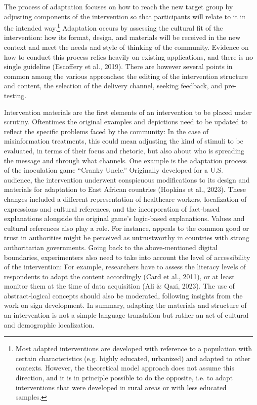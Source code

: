 \documentclass[authordate, reflection]{jote-new-article}
\begin{document}
	The process of adaptation focuses on how to reach the new target group by adjusting components of the intervention so that participants will relate to it in the intended way.\footnote{ Most adapted interventions are developed with reference to a population with certain characteristics (e.g. highly educated, urbanized) and adapted to other contexts. However, the theoretical model approach does not assume this direction, and it is in principle possible to do the opposite, i.e. to adapt interventions that were developed in rural areas or with less educated samples.} Adaptation occurs by assessing the cultural fit of the intervention: how its format, design, and materials will be received in the new context and meet the needs and style of thinking of the community. Evidence on how to conduct this process relies heavily on existing applications, and there is no single guideline (Escoffery et al., 2019). There are however several points in common among the various approaches: the editing of the intervention structure and content, the selection of the delivery channel, seeking feedback, and pre-testing.



	Intervention materials are the first elements of an intervention to be placed under scrutiny. Oftentimes the original examples and depictions need to be updated to reflect the specific problems faced by the community: In the case of misinformation treatments, this could mean adjusting the kind of stimuli to be evaluated, in terms of their focus and rhetoric, but also about who is spreading the message and through what channels. One example is the adaptation process of the inoculation game “Cranky Uncle.” Originally developed for a U.S. audience, the intervention underwent conspicuous modifications to its design and materials for adaptation to East African countries (Hopkins et al., 2023). These changes included a different representation of healthcare workers, localization of expressions and cultural references, and the incorporation of fact-based explanations alongside the original game's logic-based explanations. Values and cultural references also play a role. For instance, appeals to the common good or trust in authorities might be perceived as untrustworthy in countries with strong authoritarian governments. Going back to the above-mentioned digital boundaries, experimenters also need to take into account the level of accessibility of the intervention: For example, researchers have to assess the literacy levels of respondents to adapt the content accordingly (Card et al., 2011), or at least monitor them at the time of data acquisition (Ali \& Qazi, 2023). The use of abstract-logical concepts should also be moderated, following insights from the work on sign development. In summary, adapting the materials and structure of an intervention is not a simple language translation but rather an act of cultural and demographic localization.
\end{document}
